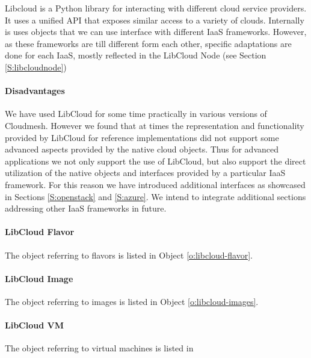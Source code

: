 \documentclass[10pt]{article}
\begin{document}
Libcloud is a Python library for interacting with different cloud
service providers. It uses a unified API that exposes similar access
to a variety of clouds. Internally is uses objects that we can use
interface with different IaaS frameworks. However, as these frameworks
are till different form each other, specific adaptations are done for
each IaaS, mostly reflected in the LibCloud Node (see Section
\ref{S:libcloudnode})

\paragraph{Disadvantages}

We have used LibCloud for some time practically in various versions of
Cloudmesh. However we found that at times the representation and
functionality provided by LibCloud for reference implementations did
not support some advanced aspects provided by the native cloud
objects. Thus for advanced applications we not only support the use of
LibCloud, but also support the direct utilization of the native
objects and interfaces provided by a particular IaaS framework. For
this reason we have introduced additional interfaces as showcased in
Sections \ref{S:openstack} and \ref{S:azure}.  We intend to integrate
additional sections addressing other IaaS frameworks in future.

\paragraph{LibCloud Flavor}

The object referring to flavors is listed in Object \ref{o:libcloud-flavor}.


\paragraph{LibCloud Image}

The object referring to images is listed in Object
\ref{o:libcloud-images}.



\paragraph{LibCloud VM}


The object referring to virtual machines is listed in 
\end{document}
